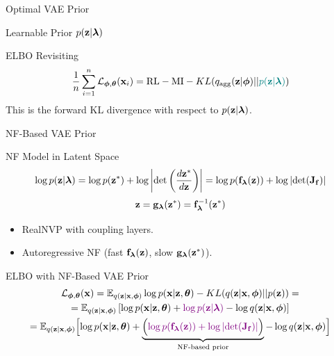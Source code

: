 \documentclass{beamer}
\begin{document}
\begin{frame}{Optimal VAE Prior}
\begin{minipage}[t]{0.5\columnwidth}
\begin{block}{Learnable Prior $p(\mathbf{z} | \boldsymbol{\lambda})$}
\begin{figure}[h]
			\end{figure}
		\end{block}
	\end{minipage}
	\vspace{-0.4cm}
	\begin{block}{ELBO Revisiting}
	\vspace{-0.3cm}
		\[
		\frac{1}{n}\sum_{i=1}^n \mathcal{L}_{\boldsymbol{\phi}, \boldsymbol{\theta}}(\mathbf{x}_i) = \text{RL} - \text{MI} -  KL(q_{\text{agg}}(\mathbf{z} | \boldsymbol{\phi}) || {\color{teal}p(\mathbf{z} | \boldsymbol{\lambda})})
		\]
		This is the forward KL divergence with respect to $p(\mathbf{z} | \boldsymbol{\lambda})$.
	\end{block}
\end{frame}
\begin{frame}{NF-Based VAE Prior}
	\begin{block}{NF Model in Latent Space}
		\vspace{-0.5cm}
		\[
		\log p(\mathbf{z} | \boldsymbol{\lambda}) = \log p(\mathbf{z}^*) + \log  \left | \det \left(\frac{d \mathbf{z}^*}{d\mathbf{z}}\right)\right| = \log p(\mathbf{f}_{\boldsymbol{\lambda}}(\mathbf{z})) + \log \left | \det (\mathbf{J}_{\mathbf{f}})\right| 
		\]
		\vspace{-0.3cm}
		\[
		\mathbf{z} = \mathbf{g}_{\boldsymbol{\lambda}}(\mathbf{z}^*) = \mathbf{f}^{-1}_{\boldsymbol{\lambda}}(\mathbf{z}^*)
		\]
	\end{block}
	\vspace{-0.3cm}
	\begin{itemize}
		\item RealNVP with coupling layers.
		\item Autoregressive NF (fast $\mathbf{f}_{\boldsymbol{\lambda}}(\mathbf{z})$, slow $\mathbf{g}_{\boldsymbol{\lambda}}(\mathbf{z}^*)$).
	\end{itemize}
	\begin{block}{ELBO with NF-Based VAE Prior}
		\vspace{-0.5cm}
		{\small
			\begin{multline*}
				\mathcal{L}_{\boldsymbol{\phi}, \boldsymbol{\theta}}(\mathbf{x}) = \mathbb{E}_{q(\mathbf{z} | \mathbf{x}, \boldsymbol{\phi})} \log p(\mathbf{x} | \mathbf{z} , \boldsymbol{\theta}) - KL(q(\mathbf{z}| \mathbf{x}, \boldsymbol{\phi}) || p(\mathbf{z})) = \\ 
				= \mathbb{E}_{q(\mathbf{z} | \mathbf{x}, \boldsymbol{\phi})} \left[ \log p(\mathbf{x} | \mathbf{z}, \boldsymbol{\theta}) + {\color{violet}\log p(\mathbf{z} | \boldsymbol{\lambda})} - \log q(\mathbf{z} | \mathbf{x}, \boldsymbol{\phi}) \right] \\
				= \mathbb{E}_{q(\mathbf{z} | \mathbf{x}, \boldsymbol{\phi})} \Bigl[ \log p(\mathbf{x} | \mathbf{z}, \boldsymbol{\theta}) + \underbrace{ \Bigl({\color{violet} \log p(\mathbf{f}_{\boldsymbol{\lambda}}(\mathbf{z})) + \log \left| \det (\mathbf{J}_{\mathbf{f}}) \right|} \Bigr) }_{\text{NF-based prior}} - \log q(\mathbf{z} | \mathbf{x}, \boldsymbol{\phi}) \Bigr] 
			\end{multline*}
		}
	\end{block}
\end{frame}
\end{document}
